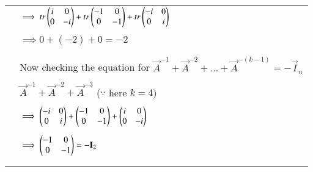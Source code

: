 \documentclass[journal,12pt]{IEEEtran}
\begin{document}
\begin{longtable}{|l|l|}
        & \qquad \qquad $\implies tr\begin{pmatrix}i&0 \\ 0&-i\end{pmatrix} + tr\begin{pmatrix}-1&0 \\ 0&-1\end{pmatrix} + tr\begin{pmatrix}-i&0 \\ 0&i\end{pmatrix}$ \\
        & \\
        & \qquad \qquad $\implies 0+(-2)+0 = -2$\\
        & \\
		& \\
		& Now checking the equation for $\vec{A}^{-1}+\Vec{A}^{-2}+...+\vec{A}^{-(k-1)} = -\vec{I}_n$ \\
        & \\
        & \qquad \qquad \qquad $\vec{A}^{-1}+\Vec{A}^{-2}+\vec{A}^{-3}$ \qquad ($\because$ here $k=4$) \\
        & \\
        & \qquad \qquad $\implies \begin{pmatrix}-i&0 \\ 0&i\end{pmatrix} + \begin{pmatrix}-1&0 \\ 0&-1\end{pmatrix} + \begin{pmatrix}i&0 \\ 0&-i\end{pmatrix}$ \\
        & \\
        & \qquad \qquad $\implies \begin{pmatrix}-1&0 \\ 0&-1\end{pmatrix} = -\mathbf{I}_2$  \\
        & \\
		& \\
		\hline
	\end{longtable}
		
\end{document}
